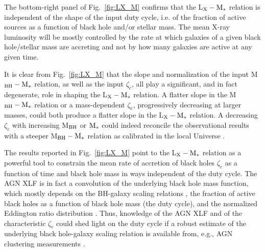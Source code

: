 The bottom-right panel of Fig.~\ref{fig:LX_M} confirms that the L$_{\rm X}-{\rm M}_*$ relation is independent of the shape of the input duty cycle, i.e. of the fraction of active sources as a function of black hole and/or stellar mass. The mean X-ray luminosity will be mostly controlled by the rate at which galaxies of a given black hole/stellar mass are accreting and not by how many galaxies are active at any given time. 

It is clear from Fig.~\ref{fig:LX_M} that the slope and normalization of the input M$_{\rm BH}-{\rm M}_*$ relation, as well as the input $\zeta_c$, all play a significant, and in fact degenerate, role in shaping the L$_{\rm X}-{\rm M}_*$ relation. A flatter slope in the M$_{\rm BH}-{\rm M}_*$ relation or a mass-dependent $\zeta_c$, progressively decreasing at larger masses, could both produce a flatter slope in the L$_{\rm X}-{\rm M}_*$ relation. A decreasing $\zeta_c$ with increasing M$_{\rm BH}$ or ${\rm M}_*$  could indeed reconcile the \citet{2020A&A...642A..65C} observational results with a steeper 
M$_{\rm BH}-{\rm M}_*$ relation as calibrated in the local Universe \citep[e.g.,][]{2016MNRAS.460.3119S,2018ApJ...869..113D}. 


The results reported in Fig.~\ref{fig:LX_M} point to the L$_{\rm X}-{\rm M}_*$ relation as a powerful tool to constrain the mean rate of accretion of black holes $\zeta_c$ as a function of time and black hole mass in ways independent of the duty cycle. 
The AGN XLF is in fact a convolution of the underlying black hole mass function, which mostly depends on the BH-galaxy scaling relations \citep[e.g.,][]{Salucci99}, the fraction of active black holes as a function of black hole mass (the duty cycle), and the normalized Eddington ratio distribution \citep[see, e.g.,][and references therein]{Shankar13Acc}. Thus, knowledge of the AGN XLF and of the characteristic $\zeta_c$ could shed light on the duty cycle if a robust estimate of the underlying black hole-galaxy scaling relation is available from, e.g., AGN clustering measurements \citep[see discussion in][]{ShankarNat}.

